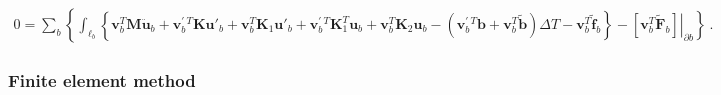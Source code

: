\documentclass[letterpaper,10pt,english]{jupyterBook}
\begin{document}
\begin{equation*}
\begin{split}0 = \sum_b \left\{ \int_{\ell_b} \left\{ \mathbf{v}_b^T \mathbf{M} \ddot{\mathbf{u}}_b + \mathbf{v}^{' \ T}_b \mathbf{K} \mathbf{u}'_b + \mathbf{v}^T_b \mathbf{K}_1 \mathbf{u}'_b + \mathbf{v}^{' \ T}_b \mathbf{K}_1^T \mathbf{u}_b + \mathbf{v}^T_b \mathbf{K}_2 \mathbf{u}_b - \left( \mathbf{v}_b^{' \ T} \mathbf{b} + \mathbf{v}_b^T \widetilde{\mathbf{b}} \right) \Delta T - \mathbf{v}_b^T \widetilde{\mathbf{f}}_b \right\} - \left.\left[ \mathbf{v}_b^T \widetilde{\mathbf{F}}_b \right]\right|_{\partial b} \right\} \ .\end{split}
\end{equation*}\subsubsection*{Finite element method}
\end{document}
